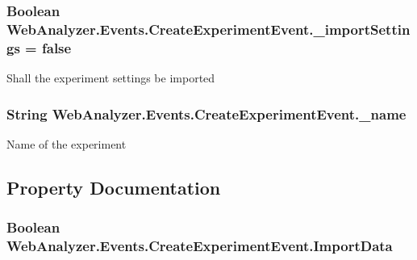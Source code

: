 \subsubsection[{\+\_\+import\+Settings}]{\setlength{\rightskip}{0pt plus 5cm}Boolean Web\+Analyzer.\+Events.\+Create\+Experiment\+Event.\+\_\+import\+Settings = {\bf false}\hspace{0.3cm}{\ttfamily [private]}}\label{class_web_analyzer_1_1_events_1_1_create_experiment_event_a0306b88d62bbb8558674ba1c9c2d1b00}


Shall the experiment settings be imported 

\hypertarget{class_web_analyzer_1_1_events_1_1_create_experiment_event_a9b05cacff687a5907c457a8ae95164b7}{}
\subsubsection[{\+\_\+name}]{\setlength{\rightskip}{0pt plus 5cm}String Web\+Analyzer.\+Events.\+Create\+Experiment\+Event.\+\_\+name\hspace{0.3cm}{\ttfamily [private]}}\label{class_web_analyzer_1_1_events_1_1_create_experiment_event_a9b05cacff687a5907c457a8ae95164b7}


Name of the experiment 



\subsection{Property Documentation}
\hypertarget{class_web_analyzer_1_1_events_1_1_create_experiment_event_a23ca6eb22cf95423be8b35c4b200da90}{}
\subsubsection[{Import\+Data}]{\setlength{\rightskip}{0pt plus 5cm}Boolean Web\+Analyzer.\+Events.\+Create\+Experiment\+Event.\+Import\+Data\hspace{0.3cm}{\ttfamily [get]}}\label{class_web_analyzer_1_1_events_1_1_create_experiment_event_a23ca6eb22cf95423be8b35c4b200da90}


